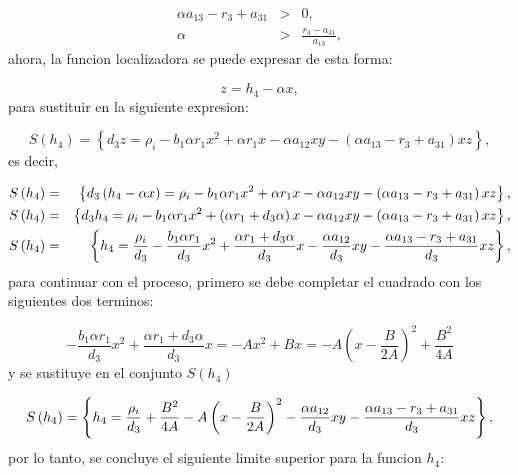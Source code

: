 \documentclass[letterpaper,11pt]{article}
\begin{document}
\begin{eqnarray*}
\alpha a_{13}-r_{3}+a_{31} &>&0, \\
\alpha  &>&\frac{r_{3}-a_{31}}{a_{13}},
\end{eqnarray*}%
ahora, la funcion localizadora se puede expresar de esta forma:

\begin{equation*}
z=h_{4}-\alpha x,
\end{equation*}%
para sustituir en la siguiente expresion:

\begin{equation*}
S\left( h_{4}\right) =\left\{ d_{3}z=\rho _{i}-b_{1}\alpha r_{1}x^{2}+\alpha
r_{1}x-\alpha a_{12}xy-\left( \alpha a_{13}-r_{3}+a_{31}\right) xz\right\} ,
\end{equation*}%
es decir,

\begin{eqnarray*}
S\left( h_{4}\right)  &=&\left\{ d_{3}\left( h_{4}-\alpha x\right) =\rho
_{i}-b_{1}\alpha r_{1}x^{2}+\alpha r_{1}x-\alpha a_{12}xy-\left( \alpha
a_{13}-r_{3}+a_{31}\right) xz\right\} , \\
S\left( h_{4}\right)  &=&\left\{ d_{3}h_{4}=\rho _{i}-b_{1}\alpha
r_{1}x^{2}+\left( \alpha r_{1}+d_{3}\alpha \right) x-\alpha a_{12}xy-\left(
\alpha a_{13}-r_{3}+a_{31}\right) xz\right\} , \\
S\left( h_{4}\right)  &=&\left\{ h_{4}=\frac{\rho _{i}}{d_{3}}-\frac{%
b_{1}\alpha r_{1}}{d_{3}}x^{2}+\frac{\alpha r_{1}+d_{3}\alpha }{d_{3}}x-%
\frac{\alpha a_{12}}{d_{3}}xy-\frac{\alpha a_{13}-r_{3}+a_{31}}{d_{3}}%
xz\right\} ,
\end{eqnarray*}%
para continuar con el proceso, primero se debe completar el cuadrado con los
siguientes dos terminos:

\begin{equation*}
-\frac{b_{1}\alpha r_{1}}{d_{3}}x^{2}+\frac{\alpha r_{1}+d_{3}\alpha }{d_{3}}%
x=-Ax^{2}+Bx=-A\left( x-\frac{B}{2A}\right) ^{2}+\frac{B^{2}}{4A}
\end{equation*}%
y se sustituye en el conjunto $S\left( h_{4}\right) $

\begin{equation*}
S\left( h_{4}\right) =\left\{ h_{4}=\frac{\rho _{i}}{d_{3}}+\frac{B^{2}}{4A}%
-A\left( x-\frac{B}{2A}\right) ^{2}-\frac{\alpha a_{12}}{d_{3}}xy-\frac{%
\alpha a_{13}-r_{3}+a_{31}}{d_{3}}xz\right\} ,
\end{equation*}%
por lo tanto, se concluye el siguiente limite superior para la funcion $h_{4}
$:
\end{document}
